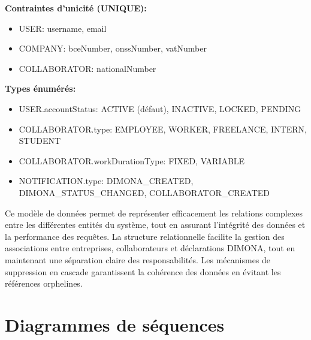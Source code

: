 \vspace{0.5cm}

\textbf{Contraintes d'unicité (UNIQUE):}
\begin{itemize}[leftmargin=*,label=\textcolor{darkgray}{$\bullet$},itemsep=0.3em]
  \item USER: username, email
  \item COMPANY: bceNumber, onssNumber, vatNumber
  \item COLLABORATOR: nationalNumber
\end{itemize}

\vspace{0.5cm}

\textbf{Types énumérés:}
\begin{itemize}[leftmargin=*,label=\textcolor{darkgray}{$\bullet$},itemsep=0.3em]
  \item USER.accountStatus: ACTIVE (défaut), INACTIVE, LOCKED, PENDING
  \item COLLABORATOR.type: EMPLOYEE, WORKER, FREELANCE, INTERN, STUDENT
  \item COLLABORATOR.workDurationType: FIXED, VARIABLE
  \item NOTIFICATION.type: DIMONA\_CREATED, DIMONA\_STATUS\_CHANGED, COLLABORATOR\_CREATED
\end{itemize}

\vspace{0.5cm}

\begin{tcolorbox}[
  title={\textbf{Modèle de données robuste}},
  colback=blue!5!white,
  colframe=primarycolor,
  fonttitle=\bfseries,
  boxrule=0.5mm,
  arc=2mm,
  left=6mm,
  right=6mm,
  top=6mm,
  bottom=6mm
]
Ce modèle de données permet de représenter efficacement les relations complexes entre les différentes entités du système, tout en assurant l'intégrité des données et la performance des requêtes. La structure relationnelle facilite la gestion des associations entre entreprises, collaborateurs et déclarations DIMONA, tout en maintenant une séparation claire des responsabilités. Les mécanismes de suppression en cascade garantissent la cohérence des données en évitant les références orphelines.
\end{tcolorbox}

\newpage

\section{Diagrammes de séquences}

